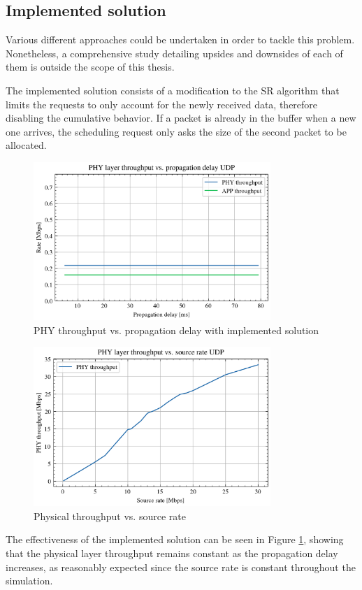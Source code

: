 \subsection{Implemented solution}

Various different approaches could be undertaken in order to tackle this problem. Nonetheless, a comprehensive study detailing upsides and downsides of each of them is outside the scope of this thesis. 

The implemented solution consists of a modification to the \ac{SR} algorithm that limits the requests to only account for the newly received data, therefore disabling the cumulative behavior. If a packet is already in the buffer when a new one arrives, the scheduling request only asks the size of the second packet to be allocated.
\begin{figure}[ht]
    \centering
    \includegraphics[width=0.8\textwidth]{res/phy_thr_new.png}
    \caption{PHY throughput vs. propagation delay with implemented solution}
    \label{fig:phy-thr-after}
\end{figure}

\begin{figure}[ht!]
    \centering
    \includegraphics[width=0.8\textwidth]{res/phy_vs_sr.png}
    \caption{Physical throughput vs. source rate}
    \label{fig:phy-vs-sr}
\end{figure}
The effectiveness of the implemented solution can be seen in Figure \ref{fig:phy-thr-after}, showing that the physical layer throughput remains constant as the propagation delay increases, as reasonably expected since the source rate is constant throughout the simulation.



